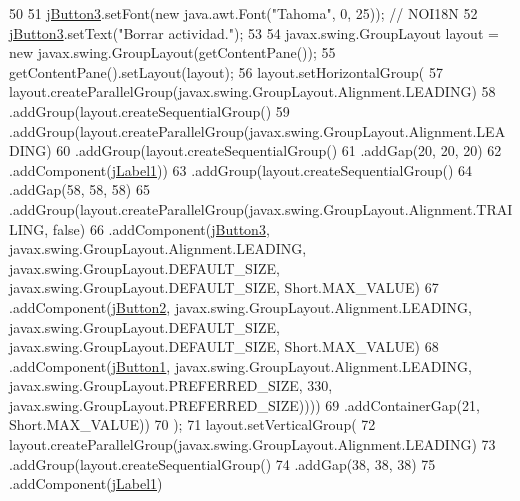 \begin{DoxyCode}
50 
51         \mbox{\hyperlink{classsoftware_1_1parasoftware2_a32aae8d275502c425e0804761777d920}{jButton3}}.setFont(\textcolor{keyword}{new} java.awt.Font(\textcolor{stringliteral}{"Tahoma"}, 0, 25)); \textcolor{comment}{// NOI18N}
52         \mbox{\hyperlink{classsoftware_1_1parasoftware2_a32aae8d275502c425e0804761777d920}{jButton3}}.setText(\textcolor{stringliteral}{"Borrar actividad."});
53 
54         javax.swing.GroupLayout layout = \textcolor{keyword}{new} javax.swing.GroupLayout(getContentPane());
55         getContentPane().setLayout(layout);
56         layout.setHorizontalGroup(
57             layout.createParallelGroup(javax.swing.GroupLayout.Alignment.LEADING)
58             .addGroup(layout.createSequentialGroup()
59                 .addGroup(layout.createParallelGroup(javax.swing.GroupLayout.Alignment.LEADING)
60                     .addGroup(layout.createSequentialGroup()
61                         .addGap(20, 20, 20)
62                         .addComponent(\mbox{\hyperlink{classsoftware_1_1parasoftware2_ac0a23aafed6d2dcc193ca1c7cd0c65f7}{jLabel1}}))
63                     .addGroup(layout.createSequentialGroup()
64                         .addGap(58, 58, 58)
65                         .addGroup(layout.createParallelGroup(javax.swing.GroupLayout.Alignment.TRAILING, \textcolor{keyword}{
      false})
66                             .addComponent(\mbox{\hyperlink{classsoftware_1_1parasoftware2_a32aae8d275502c425e0804761777d920}{jButton3}}, javax.swing.GroupLayout.Alignment.LEADING, 
      javax.swing.GroupLayout.DEFAULT\_SIZE, javax.swing.GroupLayout.DEFAULT\_SIZE, Short.MAX\_VALUE)
67                             .addComponent(\mbox{\hyperlink{classsoftware_1_1parasoftware2_abaa75d46f51c45dbab64b7bb44e560f0}{jButton2}}, javax.swing.GroupLayout.Alignment.LEADING, 
      javax.swing.GroupLayout.DEFAULT\_SIZE, javax.swing.GroupLayout.DEFAULT\_SIZE, Short.MAX\_VALUE)
68                             .addComponent(\mbox{\hyperlink{classsoftware_1_1parasoftware2_a4378147bbe05c9a06d9a8b7193295dbb}{jButton1}}, javax.swing.GroupLayout.Alignment.LEADING, 
      javax.swing.GroupLayout.PREFERRED\_SIZE, 330, javax.swing.GroupLayout.PREFERRED\_SIZE))))
69                 .addContainerGap(21, Short.MAX\_VALUE))
70         );
71         layout.setVerticalGroup(
72             layout.createParallelGroup(javax.swing.GroupLayout.Alignment.LEADING)
73             .addGroup(layout.createSequentialGroup()
74                 .addGap(38, 38, 38)
75                 .addComponent(\mbox{\hyperlink{classsoftware_1_1parasoftware2_ac0a23aafed6d2dcc193ca1c7cd0c65f7}{jLabel1}})

\end{DoxyCode}
